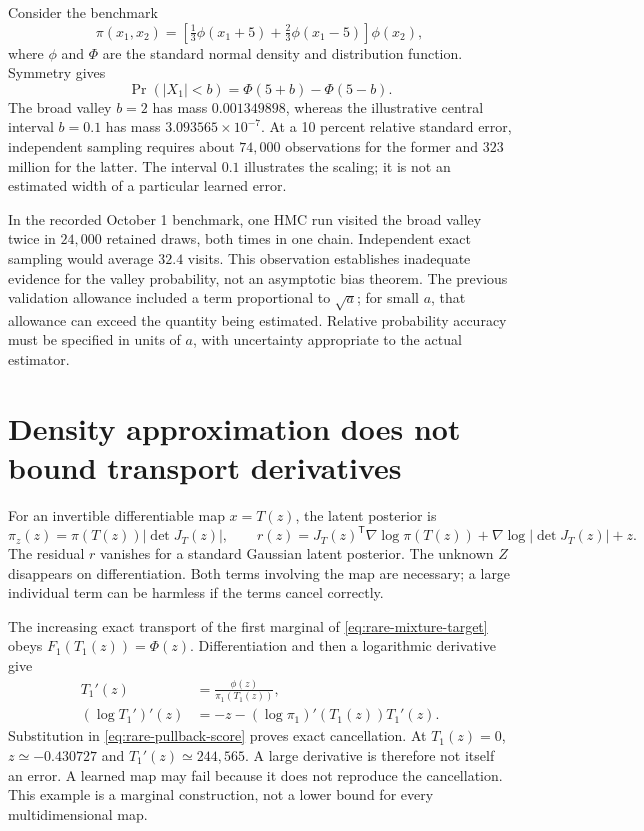 Consider the benchmark
\begin{equation}
 \pi(x_1,x_2)=\left[\tfrac13\phi(x_1+5)+\tfrac23\phi(x_1-5)\right]\phi(x_2),
 \label{eq:rare-mixture-target}
\end{equation}
where $\phi$ and $\Phi$ are the standard normal density and distribution
function. Symmetry gives
\begin{equation}
 \Pr(|X_1|<b)=\Phi(5+b)-\Phi(5-b).
 \label{eq:rare-mixture-mass}
\end{equation}
The broad valley $b=2$ has mass $0.001349898$, whereas the illustrative central
interval $b=0.1$ has mass $3.093565\times10^{-7}$. At a 10 percent relative
standard error, independent sampling requires about $74{,}000$ observations
for the former and $323$ million for the latter. The interval $0.1$ illustrates
the scaling; it is not an estimated width of a particular learned error.

In the recorded October 1 benchmark, one HMC run visited the broad valley
twice in $24{,}000$ retained draws, both times in one chain. Independent exact
sampling would average $32.4$ visits. This observation establishes inadequate
evidence for the valley probability, not an asymptotic bias theorem. The
previous validation allowance included a term proportional to $\sqrt a$;
for small $a$, that allowance can exceed the quantity being estimated. Relative
probability accuracy must be specified in units of $a$, with uncertainty
appropriate to the actual estimator.

\section[Density approximation and transport derivatives]{Density approximation does not bound transport derivatives}

For an invertible differentiable map $x=T(z)$, the latent posterior is
\begin{equation}
 \pi_z(z)=\pi(T(z))|\det J_T(z)|,\qquad
 r(z)=J_T(z)^\mathsf T\nabla\log\pi(T(z))
      +\nabla\log|\det J_T(z)|+z.
 \label{eq:rare-pullback-score}
\end{equation}
The residual $r$ vanishes for a standard Gaussian latent posterior. The unknown
$Z$ disappears on differentiation. Both terms involving the map are necessary;
a large individual term can be harmless if the terms cancel correctly.

The increasing exact transport of the first marginal of
\eqref{eq:rare-mixture-target} obeys $F_1(T_1(z))=\Phi(z)$. Differentiation
and then a logarithmic derivative give
\begin{align}
 T_1'(z)&=\frac{\phi(z)}{\pi_1(T_1(z))},\label{eq:rare-quantile-derivative}\\
 (\log T_1')'(z)&=-z-(\log\pi_1)'(T_1(z))T_1'(z).
\end{align}
Substitution in \eqref{eq:rare-pullback-score} proves exact cancellation. At
$T_1(z)=0$, $z\simeq-0.430727$ and $T_1'(z)\simeq244{,}565$. A large
derivative is therefore not itself an error. A learned map may fail because
it does not reproduce the cancellation. This example is a marginal
construction, not a lower bound for every multidimensional map.

